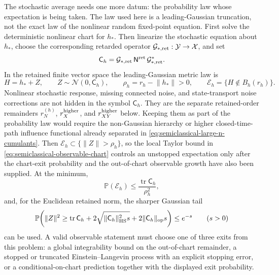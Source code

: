 \begin{controlledapproximation}
The stochastic average needs one more datum: the probability law whose
expectation is being taken.  The law used here is a leading-Gaussian
truncation, not the exact law of the nonlinear random fixed-point equation.
First solve the deterministic nonlinear chart for \(h_*\).  Then linearize the
stochastic equation about \(h_*\), choose the corresponding retarded operator
\(\mathcal G_{*,{\rm ret}}:\mathcal Y\to\mathcal X\), and set
\[
  \mathsf C_h
  =
  \mathcal G_{*,{\rm ret}}\,
  \mathsf N^{\rm ret}\,
  \mathcal G_{*,{\rm ret}}^* .
\]
In the retained finite vector space the leading-Gaussian metric law is
\begin{equation}
  H=h_*+Z,
  \qquad
  Z\sim\mathcal N(0,\mathsf C_h),
  \qquad
  \rho_h=r_h-\lVert h_*\rVert>0,
  \qquad
  \mathcal E_h=\{H\notin B_h(r_h)\}.
  \label{eq:semiclassical-observable-gaussian-law}
\end{equation}
Nonlinear stochastic response, missing connected noise, and state-transport
noise corrections are not hidden in the symbol \(\mathsf C_h\).  They are the
separate retained-order remainders \(r_N^{(h)}\), \(r_X^{\rm higher}\), and
\(r_{XY}^{\rm higher}\) below.  Keeping them as part of the probability law
would require the non-Gaussian hierarchy or higher closed-time-path influence
functional already separated in
\eqref{eq:semiclassical-large-n-cumulants}.
Then \(\mathcal E_h\subset\{\lVert Z\rVert>\rho_h\}\), so the local Taylor
bound in \eqref{eq:semiclassical-observable-chart} controls an unstopped
expectation only after the chart-exit probability and the out-of-chart
observable growth have also been supplied.  At the minimum,
\begin{equation}
  \mathbb P(\mathcal E_h)
  \le
  \frac{\operatorname{tr}\mathsf C_h}{\rho_h^2},
  \label{eq:semiclassical-observable-markov-exit-bound}
\end{equation}
and, for the Euclidean retained norm, the sharper Gaussian tail
\begin{equation}
  \mathbb P\!\left(
    \lVert Z\rVert^2
    \ge
    \operatorname{tr}\mathsf C_h
    +2\sqrt{\lVert\mathsf C_h\rVert_{\rm HS}^2s}
    +2\lVert\mathsf C_h\rVert_{\rm op}s
  \right)
  \le e^{-s}
  \qquad(s>0)
  \label{eq:semiclassical-observable-gaussian-exit-bound}
\end{equation}
can be used.  A valid observable statement must choose one of three exits from
this problem: a global integrability bound on the out-of-chart remainder, a
stopped or truncated Einstein--Langevin process with an explicit stopping
error, or a conditional-on-chart prediction together with the displayed exit
probability.


\end{controlledapproximation}
